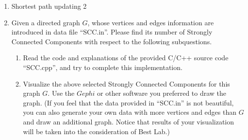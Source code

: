 \documentclass[12pt,a4paper,UTF8]{article}
\makeatletter
\newtheorem*{solution}{Solution}
\theoremstyle{definition}
\renewenvironment{solution}[1][Solution] {\par\pushQED{\qed}\normalfont\topsep6\p@\@plus6\p@\relax\trivlist\item[\hskip\labelsep\bfseries#1\@addpunct{.}]\ignorespaces}{\popQED\endtrivlist\@endpefalse} \makeatother
\makeatother
\begin{document}
\begin{enumerate}
\begin{solution}
\begin{minipage}[t]{0.89\textwidth}
\begin{algorithm}[H]
        		\;
        	\end{algorithm}
        \end{minipage}
    
    	\begin{minipage}[t]{0.89\textwidth}
    	\begin{algorithm}[H]
    		\BlankLine
    		\caption{Shortest path updating 2}
    		\label{Alg-2}
    		
    		
    		\;
    	\end{algorithm}
    \end{minipage}

    \end{solution}

	\item Given a directed graph $G$, whose vertices and edges information are introduced in data file ``SCC.in''. Please find its number of Strongly Connected Components with respect to the following subquestions.
    \begin{enumerate}
    	\item Read the code and explanations of the provided C/C++ source code ``SCC.cpp'', and try to complete this implementation.
    	\item Visualize the above selected Strongly Connected Components for this graph $G$. Use the $Gephi$ or other software you preferred to draw the graph. {\color{blue}(If you feel that the data provided in ``SCC.in'' is not beautiful, you can also generate your own data with more vertices and edges than $G$ and draw an additional graph. Notice that results of your visualization will be taken into the consideration of Best Lab.)}


\end{enumerate}
\end{enumerate}
\end{document}
